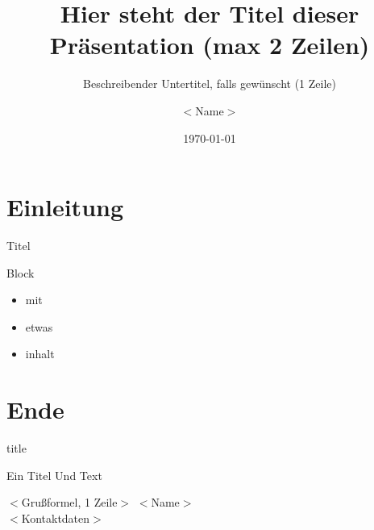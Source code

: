 \usepackage[utf8x]{inputenc}
\usepackage[ngerman]{babel}
\usepackage{amsmath}
\usepackage{tikz}
\usepackage{etex}

\title[kurzer Titel]{Hier steht der Titel dieser Präsentation (max 2 Zeilen)}
\subtitle{Beschreibender Untertitel, falls gewünscht (1 Zeile)}
\author[Kurzname]{$<$Name$>$}
\date{\today}



\begin{frame}[plain]
  \titlepage
\end{frame}


\section{Einleitung}

\begin{frame}{Titel}
  \begin{block}{Block}
    \begin{itemize}
      \item mit
      \item etwas
      \item inhalt
    \end{itemize}
  \end{block}
\end{frame}


\section{Ende}

\begin{frame}{title}
\end{frame}

\begin{logoframe}{Ein Titel}
Und Text
\end{logoframe}


\begin{finalframe}{$<$Grußformel, 1 Zeile$>$}
$<$Name$>$\\
$<$Kontaktdaten$>$
\end{finalframe}


